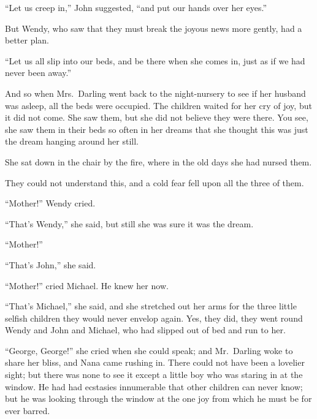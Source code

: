 ``Let us creep in,'' John suggested, ``and put our hands over her eyes.''

But Wendy, who saw that they must break the joyous news more gently,
had a better plan.

``Let us all slip into our beds, and be there when she comes in, just as
if we had never been away.''

And so when Mrs.\ Darling went back to the night-nursery to see if her
husband was asleep, all the beds were occupied. The children waited for
her cry of joy, but it did not come. She saw them, but she did not
believe they were there. You see, she saw them in their beds so often
in her dreams that she thought this was just the dream hanging around
her still.

She sat down in the chair by the fire, where in the old days she had
nursed them.

They could not understand this, and a cold fear fell upon all the three
of them.

``Mother!'' Wendy cried.

``That's Wendy,'' she said, but still she was sure it was the dream.

``Mother!''

``That's John,'' she said.

``Mother!'' cried Michael. He knew her now.

``That's Michael,'' she said, and she stretched out her arms for the
three little selfish children they would never envelop again. Yes, they
did, they went round Wendy and John and Michael, who had slipped out of
bed and run to her.

``George, George!'' she cried when she could speak; and Mr.\ Darling woke
to share her bliss, and Nana came rushing in. There could not have been
a lovelier sight; but there was none to see it except a little boy who
was staring in at the window. He had had ecstasies innumerable that
other children can never know; but he was looking through the window at
the one joy from which he must be for ever barred.
